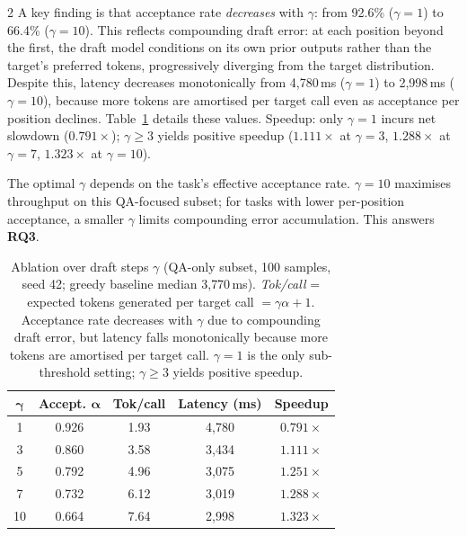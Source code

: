 \documentclass[11pt,a4paper]{article}
\begin{document}
\begin{multicols}{2}
A key finding is that acceptance rate \emph{decreases} with $\gamma$:
from 92.6\% ($\gamma=1$) to 66.4\% ($\gamma=10$).
This reflects compounding draft error: at each position beyond the first,
the draft model conditions on its own prior outputs rather than the
target's preferred tokens, progressively diverging from the target
distribution.
Despite this, latency decreases monotonically from 4{,}780\,ms ($\gamma=1$)
to 2{,}998\,ms ($\gamma=10$), because more tokens are amortised per
target call even as acceptance per position declines.
Table~\ref{tab:ablation} details these values.
Speedup: only $\gamma=1$ incurs net slowdown ($0.791\!\times$);
$\gamma \geq 3$ yields positive speedup ($1.111\!\times$ at $\gamma=3$,
$1.288\!\times$ at $\gamma=7$, $1.323\!\times$ at $\gamma=10$).

The optimal $\gamma$ depends on the task's effective acceptance rate.
$\gamma=10$ maximises throughput on this QA-focused subset; for tasks
with lower per-position acceptance, a smaller $\gamma$ limits compounding
error accumulation.
This answers \textbf{RQ3}.

\begin{table}[t]
\centering
\small
\begin{tabular}{ccccc}
\toprule
$\boldsymbol{\gamma}$ & \textbf{Accept.} $\boldsymbol{\alpha}$ &
\textbf{Tok/call} & \textbf{Latency (ms)} & \textbf{Speedup} \\
\midrule
 1 & 0.926 & 1.93 & 4{,}780 & {\color{badred}$0.791\times$}   \\
 3 & 0.860 & 3.58 & 3{,}434 & {\color{goodgreen}$1.111\times$} \\
 5 & 0.792 & 4.96 & 3{,}075 & {\color{goodgreen}$1.251\times$} \\
 7 & 0.732 & 6.12 & 3{,}019 & {\color{goodgreen}$1.288\times$} \\
10 & 0.664 & 7.64 & 2{,}998 & {\color{goodgreen}$1.323\times$} \\
\bottomrule
\end{tabular}
\caption{Ablation over draft steps $\gamma$ (QA-only subset, 100 samples,
seed 42; greedy baseline median 3{,}770\,ms).
\textit{Tok/call} = expected tokens generated per target call
$= \gamma\alpha + 1$.
Acceptance rate decreases with $\gamma$ due to compounding draft error,
but latency falls monotonically because more tokens are amortised per
target call.
$\gamma\!=\!1$ is the only sub-threshold setting; $\gamma\!\geq\!3$
yields positive speedup.}
\label{tab:ablation}
\end{table}


\end{multicols}
\end{document}
